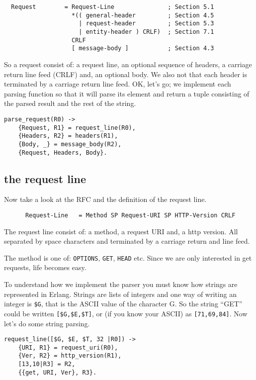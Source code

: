 \documentclass[a4paper, 11pt]{article}
\begin{document}
\begin{verbatim}
  Request        = Request-Line               ; Section 5.1
                   *(( general-header         ; Section 4.5
                     | request-header         ; Section 5.3
                     | entity-header ) CRLF)  ; Section 7.1
                   CRLF
                   [ message-body ]           ; Section 4.3
\end{verbatim}


So a request consist of: a request line, an optional sequence of
headers, a carriage return line feed (CRLF) and, an optional body. We also
not that each header is terminated by a carriage return line feed. OK,
let's go; we implement each parsing function so that it will parse its
element and return a tuple consisting of the parsed result and the
rest of the string.

\begin{verbatim}
parse_request(R0) ->
    {Request, R1} = request_line(R0),
    {Headers, R2} = headers(R1),
    {Body, _} = message_body(R2),
    {Request, Headers, Body}.
\end{verbatim}

\subsection{the request line}

Now take a look at the RFC and the definition of the request line.

\begin{verbatim}
      Request-Line   = Method SP Request-URI SP HTTP-Version CRLF
\end{verbatim}

The request line consist of: a method, a request URI and, a http
version. All separated by space characters and terminated by a
carriage return and line feed.


The method is one of: {\tt OPTIONS}, {\tt GET}, {\tt HEAD} etc. Since we
are only interested in get requests, life becomes easy. 

To understand how we implement the parser you must know how strings
are represented in Erlang. Strings are lists of integers and one way
of writing an integer is {\tt \$G}, that is the ASCII value of the
character G. So the string ``GET'' could be written {\tt [\$G,\$E,\$T]}, or (if you know your ASCII) as
{\tt [71,69,84]}. Now let's do some string parsing.

\begin{verbatim}
request_line([$G, $E, $T, 32 |R0]) ->
    {URI, R1} = request_uri(R0),
    {Ver, R2} = http_version(R1),
    [13,10|R3] = R2,
    {{get, URI, Ver}, R3}.
\end{verbatim}
\end{document}
